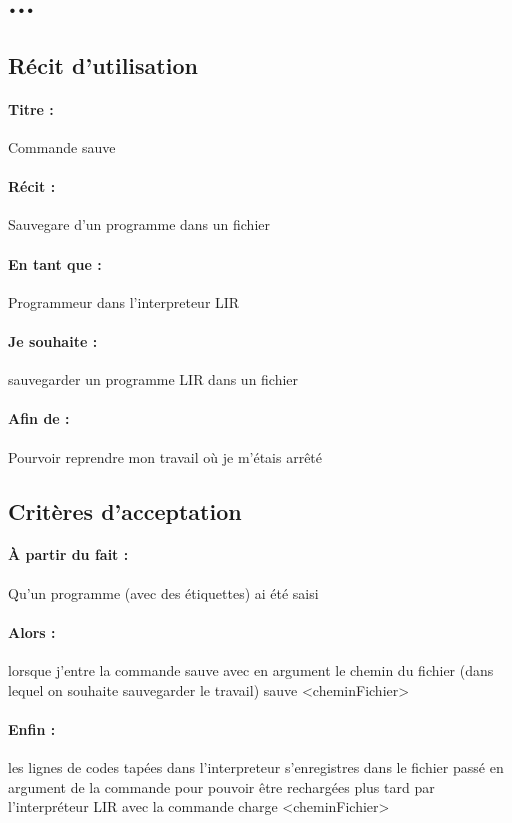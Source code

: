 \section{...} %

\subsection*{Récit d'utilisation}

\paragraph{Titre : } Commande sauve
\paragraph{Récit : } Sauvegare d'un programme dans un fichier
\paragraph{En tant que : } Programmeur dans l'interpreteur LIR
\paragraph{Je souhaite : } sauvegarder un programme LIR dans un fichier
\paragraph{Afin de : } Pourvoir reprendre mon travail où je m'étais arrêté

\subsection*{Critères d'acceptation}

\paragraph{À partir du fait : } Qu'un programme (avec des étiquettes) ai été saisi
\paragraph{Alors : } lorsque j'entre la commande sauve avec en argument le chemin du fichier (dans lequel on souhaite sauvegarder le travail)
                     sauve <cheminFichier>
\paragraph{Enfin : } les lignes de codes tapées dans l'interpreteur s'enregistres dans le fichier passé en argument de la commande
                     pour pouvoir être rechargées plus tard par l'interpréteur LIR avec la commande charge <cheminFichier>
